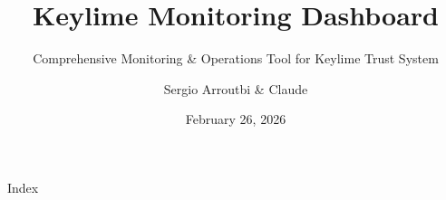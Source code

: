 \documentclass{beamer}
\title{Keylime Monitoring Dashboard}
\subtitle{Comprehensive Monitoring \& Operations Tool for Keylime Trust System}
\author{Sergio Arroutbi \& Claude}
\institute[]{ Security Special Projects}
\date{February 26, 2026}
\begin{document}
\begin{frame}
  \titlepage
\end{frame}

\begin{frame}{Index}
  \tiny
  \tableofcontents
\end{frame}























\end{document}
